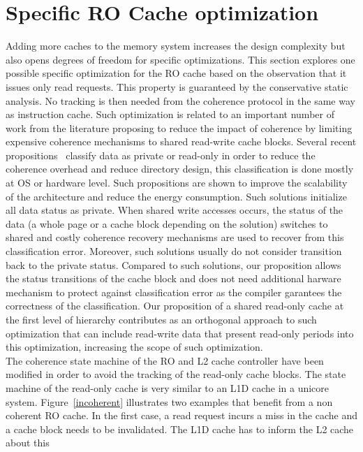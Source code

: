 \documentclass[sigconf]{acmart}
\begin{document}
 
\section{Specific RO Cache optimization}

Adding more caches to the memory system increases the design complexity but also opens degrees of freedom for specific optimizations. This section explores one possible specific optimization for the RO cache based on the observation that it issues only read requests. This property is guaranteed by the conservative static analysis. No tracking is then needed from the coherence protocol in the same way as instruction cache. Such optimization is related to an important number of work from the literature proposing to reduce the impact of coherence by limiting expensive coherence mechanisms to shared read-write cache blocks. Several recent propositions~\cite{Cuesta:2013}\cite{Ros:2012}\cite{Davari:2015} classify data as private or read-only in order to reduce the coherence overhead and reduce directory design, this classification is done mostly at OS or hardware level. Such propositions are shown to improve the scalability of the architecture and reduce the energy consumption. Such solutions initialize all data status as private. When shared write accesses occurs, the status of the data (a whole page or a cache block depending on the solution) switches to shared and costly coherence recovery mechanisms are used to recover from this classification error. Moreover, such solutions usually do not consider transition back to the private status. Compared to such solutions, our proposition allows the status transitions of the cache block and does not need additional harware mechanism to protect against classification error as the compiler garantees the correctness of the classification. Our proposition of a shared read-only cache at the first level of hierarchy contributes as an orthogonal approach to such optimization that can include read-write data that present read-only periods into this optimization, increasing the scope of such optimization.\\
\indent The coherence state machine of the RO and L2 cache controller have
been modified in order to avoid the tracking of the read-only cache
blocks. The state machine of the read-only cache is very similar to an
L1D cache in a unicore system. Figure~\ref{incoherent} illustrates two
examples that benefit from a non coherent RO cache. In the first case,
a read request incurs a miss in the cache and a cache block needs to
be invalidated. The L1D cache has to inform the L2 cache about this
\end{document}
